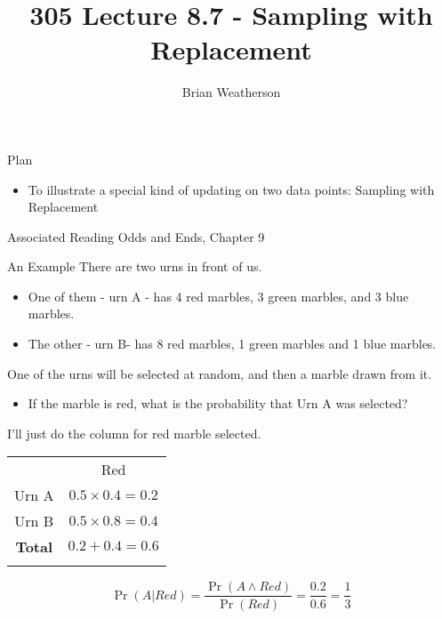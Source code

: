 \documentclass[
  ignorenonframetext,
]{beamer}
\title{305 Lecture 8.7 - Sampling with Replacement}
\author{Brian Weatherson}
\date{}
\providecommand{\tightlist}{%
  \setlength{\itemsep}{0pt}\setlength{\parskip}{0pt}}
\renewcommand{\,}{\text{, }}
\begin{document}
\frame{\titlepage}

\begin{frame}{Plan}
\protect\hypertarget{plan}{}
\begin{itemize}
\tightlist
\item
  To illustrate a special kind of updating on two data points: Sampling
  with Replacement
\end{itemize}
\end{frame}

\begin{frame}{Associated Reading}
\protect\hypertarget{associated-reading}{}
Odds and Ends, Chapter 9
\end{frame}

\begin{frame}{An Example}
\protect\hypertarget{an-example}{}
There are two urns in front of us.

\begin{itemize}
\tightlist
\item
  One of them - urn A - has 4 red marbles, 3 green marbles, and 3 blue
  marbles.
\item
  The other - urn B- has 8 red marbles, 1 green marbles and 1 blue
  marbles. \pause
\end{itemize}

One of the urns will be selected at random, and then a marble drawn from
it.

\begin{itemize}
\tightlist
\item
  If the marble is red, what is the probability that Urn A was selected?
\end{itemize}
\end{frame}

\begin{frame}
I'll just do the column for red marble selected.

\begin{longtable}[]{@{}cc@{}}
\toprule
& Red \\ \addlinespace
\midrule
\endhead
Urn A & \(0.5 \times 0.4 = 0.2\) \\ \addlinespace
Urn B & \(0.5 \times 0.8 = 0.4\) \\ \addlinespace
\textbf{Total} & \(0.2 + 0.4 = 0.6\) \\ \addlinespace
\bottomrule
\end{longtable}

\[
\Pr(A | Red) = \frac{\Pr(A \wedge Red)}{\Pr(Red)} = \frac{0.2}{0.6} = \frac{1}{3}
\]
\end{frame}
\end{document}
